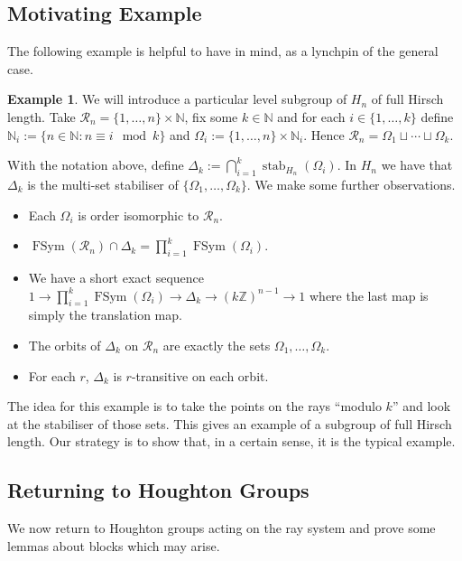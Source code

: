 \documentclass[11pt,a4paper]{amsart}
\theoremstyle{definition}
\newtheorem{example}[theorem]{Example}
\theoremstyle{remark}
\newcommand{\FSym}{\operatorname{FSym}}
\newcommand{\Z}{\mathbb Z}
\newcommand{\N}{\mathbb N}
\newcommand{\Ra}{\mathcal{R}}
\newcommand{\stab}{\operatorname{stab}}
\begin{document}
\subsection*{Motivating Example}


The following example is helpful to have in mind, as a lynchpin of the general case. 

\begin{example} We will introduce a particular level subgroup of $H_n$ of full Hirsch length.
Take $\Ra_n=\{1, \ldots, n\}\times \N$, fix some $k\in \N$ and for each $i\in \{1, \ldots, k\}$ define $\N_i:=\{n\in \N : n\equiv i\mod k\}$ and $\Omega_i:=\{1, \ldots, n\}\times \N_i$. Hence $\Ra_n=\Omega_1\sqcup \cdots\sqcup \Omega_k$.

With the notation above, define $\Delta_k:=\bigcap_{i=1}^k \stab_{H_n}(\Omega_i)$. In $H_n$ we have that $\Delta_k$ is the multi-set stabiliser of $\{\Omega_1, \ldots, \Omega_k\}$. We make some further observations.
\begin{itemize}
\item Each $\Omega_i$ is order isomorphic to $\Ra_n$.
\item $\FSym(\Ra_n)\cap \Delta_k=\prod_{i=1}^k \FSym(\Omega_i)$.
\item We have a short exact sequence $1\to \prod_{i=1}^k \FSym(\Omega_i)\to \Delta_k\to (k\Z)^{n-1}\to 1$ where the last map is simply the translation map.
\item The orbits of $\Delta_k$ on $\Ra_n$ are exactly the sets $\Omega_1, \ldots, \Omega_k$.
\item For each $r$, $\Delta_k$ is $r$-transitive on each orbit. 
\end{itemize}
\end{example}

The idea for this example is to take the points on the rays ``modulo $k$'' and look at the stabiliser of those sets. This gives an example of a subgroup of full Hirsch length. Our strategy is to show that, in a certain sense, it is the typical example.

\subsection*{Returning to Houghton Groups}


We now return to Houghton groups acting on the ray system and prove some lemmas about blocks which may arise. 
\end{document}
